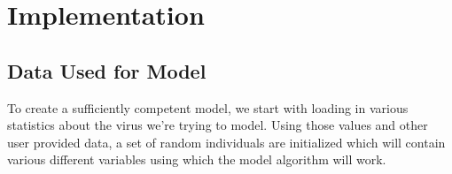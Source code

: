 \documentclass[11pt]{article}
\begin{document}
\section{Implementation}
\subsection{Data Used for Model}



To create a sufficiently competent model, we start with loading in various statistics about the virus we're trying to model. Using those values and other user provided data, a set of random individuals are initialized which will contain various different variables using which the model algorithm will work.
\end{document}
